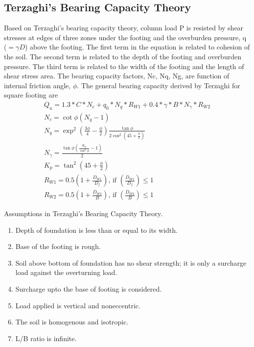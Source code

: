 \subsection{Terzaghi’s Bearing Capacity Theory}
Based on Terzaghi’s bearing capacity theory, column load P is resisted by shear stresses at edges of three zones under the footing and the overburden pressure, q ($=\gamma D$) above the footing.  The first term in the equation is related to cohesion of the soil. The second term is related to the depth of the footing and overburden pressure. The third term is related to the width of the footing and the length of shear stress area. The bearing capacity factors, Nc, Nq, Ng, are function of internal friction angle, $\phi$.
The general bearing capacity derived by Terzaghi for square footing are
\begin{gather}
Q_u = 1.3 * C * N_c + q_0 * N_q * R_{W1} + 0.4 * {\gamma} * B * N_{\gamma} * R_{W2} \\
N_c = \cot \phi (N_q - 1)\\
N_q = \exp ^ 2 (\frac{3\phi}{4} - \frac{\phi}{2}) \frac{\tan \phi}{2 \cos ^2 (45 + \frac{\phi}{2})}\\
N_{\gamma} = \frac{\tan \phi (\frac{K_p}{\cos ^2 \phi} - 1)}{2}\\
K_p= \tan ^ 2 (45 + \frac{\phi}{2})\\
R_{W1} = 0.5 (1 +\frac{D_{W1}}{D_f}) \text{, if } (\frac{D_{W1}}{D_f})\le 1 \\
R_{W2} = 0.5 (1 +\frac{D_{W2}}{B})\text{, if } (\frac{D_{W2}}{B})\le 1
\end{gather}

Assumptions in Terzaghi’s Bearing Capacity Theory.
\begin{enumerate}
\item Depth of foundation is less than or equal to its width.
\item Base of the footing is rough.
\item Soil above bottom of foundation has no shear strength; it is only a surcharge load against the overturning load.
\item Surcharge upto the base of footing is considered.
\item Load applied is vertical and non\-eccentric.
\item The soil is homogenous and isotropic.
\item L/B ratio is infinite.
\end{enumerate}

